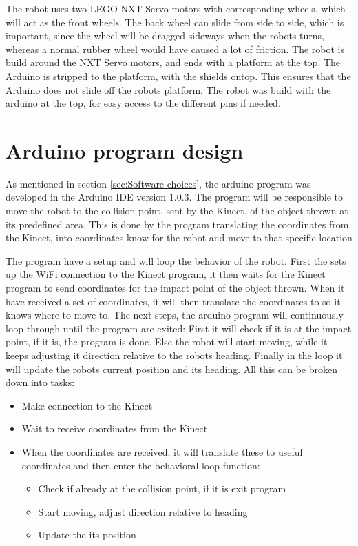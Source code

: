 The robot uses two LEGO NXT Servo motors with corresponding wheels, which will act as the front wheels. The back wheel can slide from side to side, which is important, since the wheel will be dragged sideways when the robots turns, whereas a normal rubber wheel would have caused a lot of friction. 
The robot is build around the NXT Servo motors, and ends with a platform at the top. The Arduino is stripped to the platform, with the shields ontop. This ensures that the Arduino does not slide off the robots platform.
The robot was build with the arduino at the top, for easy access to the different pins if needed. 

\section{Arduino program design}
\label{sec:Arduino program design}
As mentioned in section \ref{sec:Software choices}, the arduino program was developed in the Arduino IDE version 1.0.3. The program will be responsible to move the robot to the collision point, sent by the Kinect, of the object thrown at its predefined area. This is done by the program translating the coordinates from the Kinect, into coordinates know for the robot and move to that specific location

The program have a setup and will loop the behavior of the robot. First the sets up the WiFi connection to the Kinect program, it then waits for the Kinect program to send coordinates for the impact point of the object thrown. When it have received a set of coordinates, it will then translate the coordinates to so it knows where to move to. The next steps, the arduino program will continuously loop through until the program are exited: First it will check if it is at the impact point, if it is, the program is done. Else the robot will start moving, while it keeps adjusting it direction relative to the robots heading. Finally in the loop it will update the robots current position and its heading. All this can be broken down into tasks:

\begin{itemize}
	\item Make connection to the Kinect
	\item Wait to receive coordinates from the Kinect
	\item When the coordinates are received, it will translate these to useful coordinates and then enter the behavioral loop function:
	\begin{itemize}
		\item Check if already at the collision point, if it is exit program
		\item Start moving, adjust direction relative to heading
		\item Update the its position
	\end{itemize}
\end{itemize}
 

